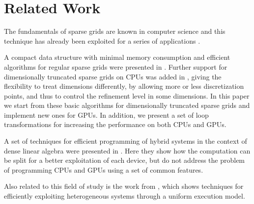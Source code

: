 \section{Related Work}
\label{sec:related_work}
The fundamentals of sparse grids are known in computer science and this
technique has already been exploited for a series of applications
\cite{CambridgeJournals:227245}.

A compact data structure with minimal memory consumption and efficient
algorithms for regular sparse grids were presented in
\cite{Murarasu:2011:CDS:1941553.1941559}. Further support for dimensionally
truncated sparse grids on CPUs was added in \cite{murarasu12fastsg:}, giving the
flexibility to treat dimensions differently, by allowing more or less
discretization points, and thus to control the refinement level in some
dimensions. In this paper we start from these basic algorithms for dimensionally
truncated sparse grids and implement new ones for GPUs. In addition, we present
a set of loop transformations for increasing the performance on both CPUs and
GPUs.

A set of techniques for efficient programming of hybrid systems in the context
of dense linear algebra were presented in \cite{Tomov:2010:TDL:1805333.1805388}.
Here they show how the computation can be split for a better exploitation of
each device, but do not address the problem of programming CPUs and GPUs using a
set of common features.

Also related to this field of study is the work from
\cite{Augonnet:2011:SUP:1951453.1951454}, which shows techniques for efficiently
exploiting heterogeneous systems through a uniform execution model.
